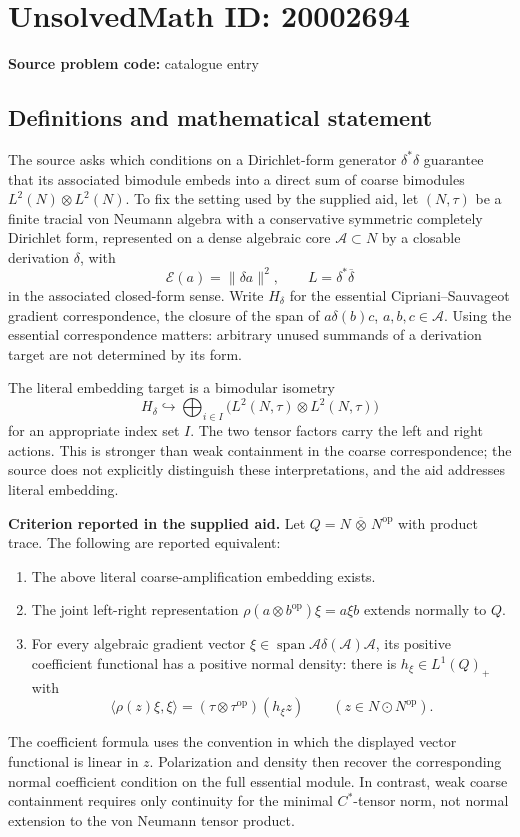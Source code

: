 \documentclass[11pt]{article}
\begin{document}
\section*{UnsolvedMath ID: 20002694}
\textbf{Source problem code:} catalogue entry
\subsection{Definitions and mathematical statement}
The source asks which conditions on a Dirichlet-form generator \(\delta^*\delta\) guarantee that its associated bimodule embeds into a direct sum of coarse bimodules \(L^2(N)\otimes L^2(N)\). To fix the setting used by the supplied aid, let \((N,\tau)\) be a finite tracial von Neumann algebra with a conservative symmetric completely Dirichlet form, represented on a dense algebraic core \(\mathcal A\subset N\) by a closable derivation \(\delta\), with
\[
 \mathcal E(a)=\|\delta a\|^2,
 \qquad L=\delta^*\overline\delta
\]
in the associated closed-form sense. Write \(H_\delta\) for the essential Cipriani--Sauvageot gradient correspondence, the closure of the span of \(a\delta(b)c\), \(a,b,c\in\mathcal A\). Using the essential correspondence matters: arbitrary unused summands of a derivation target are not determined by its form.

The literal embedding target is a bimodular isometry
\[
 H_\delta\hookrightarrow
 \bigoplus_{i\in I}\bigl(L^2(N,\tau)\otimes L^2(N,\tau)\bigr)
\]
for an appropriate index set \(I\). The two tensor factors carry the left and right actions. This is stronger than weak containment in the coarse correspondence; the source does not explicitly distinguish these interpretations, and the aid addresses literal embedding.

\textbf{Criterion reported in the supplied aid.} Let \(Q=N\,\overline\otimes\,N^{\mathrm{op}}\) with product trace. The following are reported equivalent:
\begin{enumerate}
\item The above literal coarse-amplification embedding exists.
\item The joint left-right representation \(\rho(a\otimes b^{\mathrm{op}})\xi=a\xi b\) extends normally to \(Q\).
\item For every algebraic gradient vector \(\xi\in\operatorname{span}\mathcal A\delta(\mathcal A)\mathcal A\), its positive coefficient functional has a positive normal density: there is \(h_\xi\in L^1(Q)_+\) with
\[
 \langle\rho(z)\xi,\xi\rangle
      =(\tau\otimes\tau^{\mathrm{op}})(h_\xi z)
      \qquad(z\in N\odot N^{\mathrm{op}}).
\]
\end{enumerate}
The coefficient formula uses the convention in which the displayed vector functional is linear in \(z\). Polarization and density then recover the corresponding normal coefficient condition on the full essential module. In contrast, weak coarse containment requires only continuity for the minimal \(C^*\)-tensor norm, not normal extension to the von Neumann tensor product.
\end{document}

